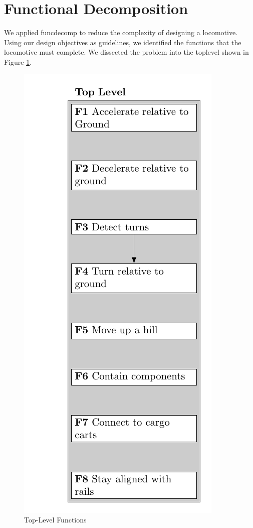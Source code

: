 \documentclass[class=../report, crop=false]{standalone}
\begin{document}
\section{Functional Decomposition}

We applied \gls{funcdecomp} to reduce the complexity of designing a locomotive.
Using our design objectives as guidelines, we identified the functions that the locomotive must complete.
We dissected the problem into the \gls{toplevel} shown in Figure \ref{fig:toplevel}.

\begin{figure}[h]
	\centering
	\includegraphics{../../bin/toplevel.pdf}
	\caption{Top-Level Functions}
	\label{fig:toplevel}
\end{figure}
\end{document}

